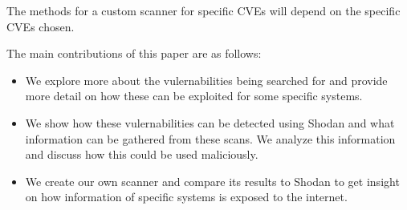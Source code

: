 The methods for a custom scanner for specific CVEs will depend on the
specific CVEs chosen.

The main contributions of this paper are as follows:
\begin{itemize}
    \item We explore more about the vulernabilities being searched for and
        provide more detail on how these can be exploited for some specific
        systems.
    \item We show how these vulernabilities can be detected using Shodan
        and what information can be gathered from these scans. We analyze
        this information and discuss how this could be used maliciously.
    \item We create our own scanner and compare its results to Shodan to
        get insight on how information of specific systems is exposed to
        the internet.
\end{itemize}
